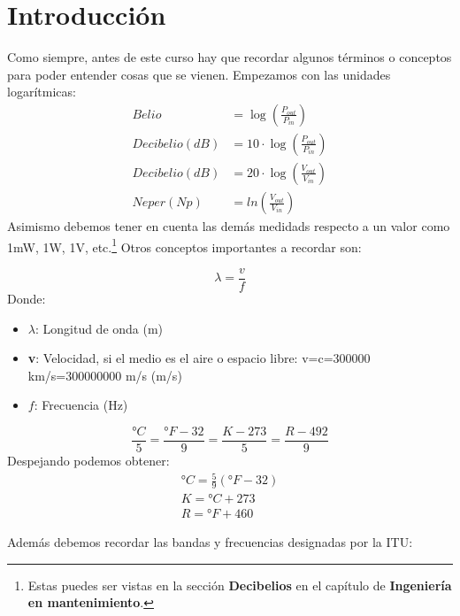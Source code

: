\documentclass[12pt,fleqn,a4paper,oneside]{LegrandOrangeBook}
\begin{document}
\section{Introducción}
Como siempre, antes de este curso hay que recordar algunos términos o conceptos para poder entender cosas que se vienen. Empezamos con las unidades logarítmicas:
\begin{align*}
Belio&=\log\left(\frac{P_{out}}{P_{in}}\right)\\
Decibelio(dB)&=10\cdot\log\left(\frac{P_{out}}{P_{in}}\right)\\
Decibelio(dB)&=20\cdot\log\left(\frac{V_{out}}{V_{in}}\right)\\
Neper(Np)&=ln\left(\frac{V_{out}}{V_{in}}\right)
\end{align*}
Asimismo debemos tener en cuenta las demás medidads respecto a un valor como 1mW, 1W, 1V, etc.\footnote{Estas puedes ser vistas en la sección \textbf{Decibelios} en el capítulo de \textbf{Ingeniería en mantenimiento}.}
Otros conceptos importantes a recordar son:
\begin{definition}
\begin{equation}
\lambda=\frac{v}{f}
\end{equation}
Donde:
\begin{itemize}
\item $\lambda$: Longitud de onda (m)
\item \textbf{v}: Velocidad, si el medio es el aire o espacio libre: v=c=300000 km/s=300000000 m/s (m/s)
\item $f$: Frecuencia (Hz)
\end{itemize}
\end{definition}
\begin{definition}[Temperatura]
\begin{equation}
\frac{°C}{5}=\frac{°F-32}{9}=\frac{K-273}{5}=\frac{R-492}{9}
\end{equation}
Despejando podemos obtener:
\begin{align*}
°C=\frac{5}{9}\left(°F-32\right)\\
K=°C+273\\
R=°F+460
\end{align*}
\end{definition}
Además debemos recordar las bandas y frecuencias designadas por la ITU:
\end{document}
